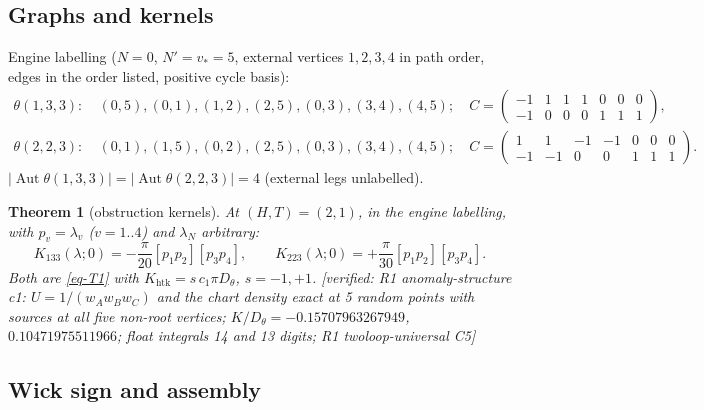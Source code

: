 \documentclass[10pt,a4paper]{article}
\numberwithin{equation}{section}
\newtheorem{theorem}{Theorem}[section]
\theoremstyle{definition}
\theoremstyle{remark}
\newcommand{\Aut}{\operatorname{Aut}}
\newcommand{\ver}[1]{\textup{[verified: #1]}}
\newcommand{\htk}{\mathrm{htk}}
\begin{document}
\subsection{Graphs and kernels}\label{sec-graphs}

Engine labelling ($N=0$, $N'=v_*=5$, external vertices $1,2,3,4$ in path order, edges in the order listed, positive cycle basis):
\begin{align}
\theta(1,3,3):&\ (0,5),(0,1),(1,2),(2,5),(0,3),(3,4),(4,5);\quad C=\begin{pmatrix}-1&1&1&1&0&0&0\\-1&0&0&0&1&1&1\end{pmatrix},\\
\theta(2,2,3):&\ (0,1),(1,5),(0,2),(2,5),(0,3),(3,4),(4,5);\quad C=\begin{pmatrix}1&1&-1&-1&0&0&0\\-1&-1&0&0&1&1&1\end{pmatrix}.
\end{align}
$|\Aut\theta(1,3,3)|=|\Aut\theta(2,2,3)|=4$ (external legs unlabelled).

\begin{theorem}[obstruction kernels]\label{thm-kernels}
At $(H,T)=(2,1)$, in the engine labelling, with $p_v=\lambda_v$ ($v=1..4$) and $\lambda_N$ arbitrary:
\begin{equation}
K_{133}(\lambda;0)=-\frac{\pi}{20}[p_1p_2][p_3p_4],\qquad K_{223}(\lambda;0)=+\frac{\pi}{30}[p_1p_2][p_3p_4].
\end{equation}
Both are \eqref{eq-T1} with $K_\htk=s\,c_1\pi D_\theta$, $s=-1,+1$.
\ver{R1 anomaly-structure c1: $U=1/(w_Aw_Bw_C)$ and the chart density exact at 5 random points with sources at all five non-root vertices; $K/D_\theta=-0.15707963267949$, $0.10471975511966$; float integrals 14 and 13 digits; R1 twoloop-universal C5}
\end{theorem}

\subsection{Wick sign and assembly}\label{sec-wick}
\end{document}
